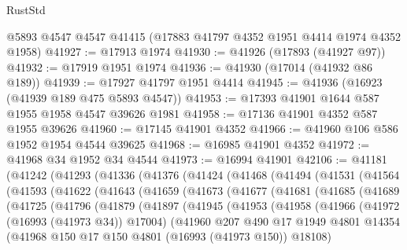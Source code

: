 \begin{lexlean}{RustStd}
\begin{coremodule}
{\begin{coremodule}
{{{{{{{{{{{{{{{{{{{{{{{{{{{{{{{{{{{{{{{{{{{{{{{{{{{{{{{    @5893
    @4547
    @4547
    @41415
    (@17883 @41797 @4352 @1951 @4414 @1974 @4352 @1958)
@41927 := @17913 @1974
@41930 := @41926 (@17893 (@41927 @97))
@41932 := @17919 @1951 @1974
@41936 := @41930 (@17014 (@41932 @86 @189))
@41939 := @17927 @41797 @1951 @4414
@41945 := @41936 (@16923 (@41939 @189 @475 @5893 @4547))
@41953 := @17393 @41901 @1644 @587 @1955 @1958 @4547 @39626 @1981
@41958 := @17136 @41901 @4352 @587 @1955 @39626
@41960 := @17145 @41901 @4352
@41966 := @41960 @106 @586 @1952 @1954 @4544 @39625
@41968 := @16985 @41901 @4352
@41972 := @41968 @34 @1952 @34 @4544
@41973 := @16994 @41901
@42106 := @41181
    (@41242
      (@41293
        (@41336
          (@41376
            (@41424
              (@41468
                (@41494
                  (@41531
                    (@41564
                      (@41593
                        (@41622
                          (@41643
                            (@41659
                              (@41673
                                (@41677
                                  (@41681
                                    (@41685
                                      (@41689
                                        (@41725
                                          (@41796
                                            (@41879
                                              (@41897
                                                (@41945
                                                  (@41953
                                                    (@41958
                                                      (@41966
                                                        (@41972 (@16993 (@41973 @34)) @17004)
                                                        (@41960
                                                          @207
                                                          @490
                                                          @17
                                                          @1949
                                                          @4801
                                                          @14354
                                                          (@41968
                                                            @150
                                                            @17
                                                            @150
                                                            @4801
                                                            (@16993 (@41973 @150))
                                                            @18108)
}}}}}}}}}}}}}}}}}}}}}}}}}}}}}}}}}}}}}}}}}}}}}}}}}}}}}}}
\end{coremodule}}
\end{coremodule}
\end{lexlean}
